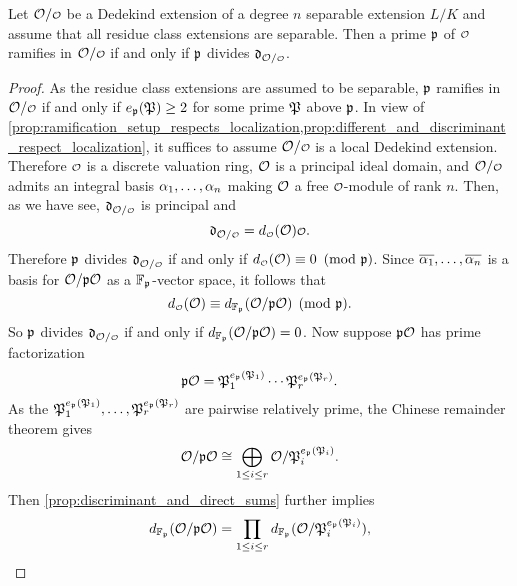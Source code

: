     \begin{theorem}\label{thm:ramifies_if_and_only_if_divides_the_discriminant}
      Let $\mc{O}/\smc{O}$ be a Dedekind extension of a degree $n$ separable extension $L/K$ and assume that all residue class extensions are separable. Then a prime $\mathfrak{p}$ of $\smc{O}$ ramifies in $\mc{O}/\smc{O}$ if and only if $\mathfrak{p}$ divides $\mf{d}_{\mc{O}/\smc{O}}$.
    \end{theorem}
    \begin{proof}
      As the residue class extensions are assumed to be separable, $\mathfrak{p}$ ramifies in $\mc{O}/\smc{O}$ if and only if $e_{\mathfrak{p}}(\mathfrak{P}) \ge 2$ for some prime $\mathfrak{P}$ above $\mathfrak{p}$. In view of \cref{prop:ramification_setup_respects_localization,prop:different_and_discriminant_respect_localization}, it suffices to assume $\mc{O}/\smc{O}$ is a local Dedekind extension. Therefore $\smc{O}$ is a discrete valuation ring, $\mathcal{O}$ is a principal ideal domain, and $\mc{O}/\smc{O}$ admits an integral basis $\alpha_{1},\ldots,\alpha_{n}$ making $\mathcal{O}$ a free $\smc{O}$-module of rank $n$. Then, as we have see, $\mf{d}_{\mc{O}/\smc{O}}$ is principal and
      \[
        \mf{d}_{\mc{O}/\smc{O}} = d_{\smc{O}}(\mc{O})\smc{O}.
      \]
      Therefore $\mathfrak{p}$ divides $\mf{d}_{\mc{O}/\smc{O}}$ if and only if $d_{\smc{O}}(\mc{O}) \equiv 0 \tmod{\mf{p}}$. Since $\overline{\alpha_{1}},\ldots,\overline{\alpha_{n}}$ is a basis for $\mathcal{O}/\mathfrak{p}\mathcal{O}$ as a $\mathbb{F}_{\mathfrak{p}}$-vector space, it follows that
      \[
        d_{\smc{O}}(\mc{O}) \equiv d_{\F_{\mf{p}}}(\mc{O}/\mf{p}\mc{O}) \pmod{\mf{p}}.
      \]
      So $\mathfrak{p}$ divides $\mf{d}_{\mc{O}/\smc{O}}$ if and only if $d_{\mathbb{F}_{\mathfrak{p}}}(\mathcal{O}/\mathfrak{p}\mathcal{O}) = 0$. Now suppose $\mathfrak{p}\mathcal{O}$ has prime factorization
      \[
        \mathfrak{p}\mathcal{O} = \mathfrak{P}_{1}^{e_{\mathfrak{p}}(\mathfrak{P}_{1})} \cdots \mathfrak{P}_{r}^{e_{\mathfrak{p}}(\mathfrak{P}_{r})}.
      \]
      As the $\mathfrak{P}_{1}^{e_{\mathfrak{p}}(\mathfrak{P}_{1})},\ldots,\mathfrak{P}_{r}^{e_{\mathfrak{p}}(\mathfrak{P}_{r})}$ are pairwise relatively prime, the Chinese remainder theorem gives
      \[
        \mathcal{O}/\mathfrak{p}\mathcal{O} \cong \bigoplus_{1 \le i \le r} \mathcal{O}/\mathfrak{P}_{i}^{e_{\mathfrak{p}}(\mathfrak{P}_{i})}.
      \]
      Then \cref{prop:discriminant_and_direct_sums} further implies
      \[
        d_{\mathbb{F}_{\mathfrak{p}}}(\mathcal{O}/\mathfrak{p}\mathcal{O}) = \prod_{1 \le i \le r}d_{\mathbb{F}_{\mathfrak{p}}}(\mathcal{O}/\mathfrak{P}_{i}^{e_{\mathfrak{p}}(\mathfrak{P}_{i})}),
      \]

\end{proof}
